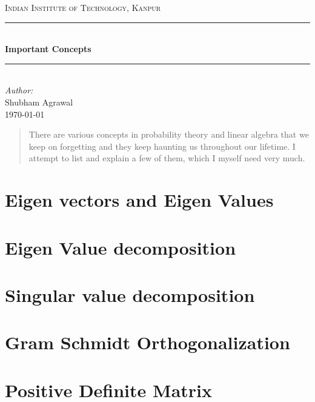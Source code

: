 \documentclass[12pt]{article}
\begin{document}
	\begin{titlepage}
		
		\newcommand{\HRule}{\rule{\linewidth}{0.5mm}} %
		\center %
		 
		\textsc{\LARGE Indian Institute of Technology, Kanpur}\\[1.5cm] 
		
		
		\HRule \\[0.4cm]
		{ \huge \bfseries Important Concepts}\\[0.4cm] %
		\HRule \\[1.5cm]
		 
		\Large \emph{Author:}\\
		Shubham Agrawal\\[3cm] %
		
		
		{\large \today}\\[2cm] %
		
		\vfill %
	
	\end{titlepage}
	
	
	\begin{abstract}
	There are various concepts in probability theory and linear algebra that we keep on forgetting and they keep haunting us throughout our lifetime. I attempt to list and explain a few of them, which I myself need very much. 
	\end{abstract}	
	\section{Eigen vectors and Eigen Values}
	\section{Eigen Value decomposition}
	\section{Singular value decomposition}
	\section{Gram Schmidt Orthogonalization}
	\section{Positive Definite Matrix}
	
\end{document}
